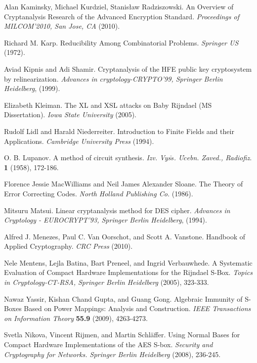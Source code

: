 \documentclass[11pt,american]{report}
\begin{document}
\begin{thebibliography}{9}
 Alan Kaminsky, Michael Kurdziel, Stanis{\l}aw Radziszowski. An Overview of Cryptanalysis Research of the Advanced Encryption Standard. \emph{Proceedings of MILCOM'2010, San Jose, CA} (2010).

 Richard M. Karp. Reducibility Among Combinatorial Problems. \emph{Springer US} (1972).

 Aviad Kipnis and Adi Shamir. Cryptanalysis of the HFE public key cryptosystem by relinearization. \emph{Advances in cryptology-CRYPTO’99, Springer Berlin Heidelberg}, (1999).

 Elizabeth Kleiman. The XL and XSL attacks on Baby Rijndael (MS Dissertation). \emph{Iowa State University} (2005).

 Rudolf Lidl and Harald Niederreiter. Introduction to Finite Fields and their Applications. \emph{Cambridge University Press} (1994).

 O. B. Lupanov. A method of circuit synthesis. \emph{Izv. Vys$\breve{s}$. U$\breve{c}$ebn. Zaved., Radiofiz.} \textbf{1} (1958), 172-186.

 Florence Jessie MacWilliams and Neil James Alexander Sloane. The Theory of Error Correcting Codes. \emph{North Holland Publishing Co.} (1986).

 Mitsuru Matsui. Linear cryptanalysis method for DES cipher. \emph{Advances in Cryptology - EUROCRYPT’93, Springer Berlin Heidelberg}, (1994).

 Alfred J. Menezes, Paul C. Van Oorschot, and Scott A. Vanstone. Handbook of Applied Cryptography. \emph{CRC Press} (2010).

 Nele Mentens, Lejla Batina, Bart Preneel, and Ingrid Verbauwhede. A Systematic Evaluation of Compact Hardware Implementations for the Rijndael S-Box. \emph{Topics in Cryptology-CT-RSA, Springer Berlin Heidelberg} (2005), 323-333.

 Nawaz Yassir, Kishan Chand Gupta, and Guang Gong. Algebraic Immunity of S-Boxes Based on Power Mappings: Analysis and Construction. \emph{IEEE Transactions on Information Theory} \textbf{55.9} (2009), 4263-4273.

 Svetla Nikova, Vincent Rijmen, and Martin Schl\"{a}ffer. Using Normal Bases for Compact Hardware Implementations of the AES S-box. \emph{Security and Cryptography for Networks. Springer Berlin Heidelberg} (2008), 236-245.


\end{thebibliography}
\end{document}
